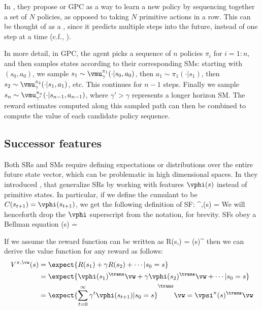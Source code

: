 In \citep{Thakoor2022}, they propose
 or GPC
as a way to learn a new policy by sequencing together
a set of $N$ policies, as opposed to taking $N$ primitive actions
in a row.
This can be thought of as a , since it predicts
multiple steps into the future, instead of one step at a time
(c.f., \citep{Zhang2023jumpy}).

In more detail, in GPC, the agent picks a sequence of $n$
policies $\pi_i$ for $i=1:n$, and then samples states
according to their corresponding SMs:
starting with $(s_0,a_0)$, we sample
$s_1 \sim \vmu_{\gamma}^{\pi_1}(\cdot|s_0,a_0)$,
then $a_1 \sim \pi_1(\cdot | s_1)$,
then
$s_2 \sim \vmu_{\gamma}^{\pi_2}(\cdot|s_1,a_1)$,
etc.
This continues for $n-1$ steps.
Finally we sample $s_n \sim \vmu_{\gamma'}^{\pi_n}(\cdot|s_{n-1},a_{n-1})$,
where $\gamma' > \gamma$ represents a longer horizon SM.
The reward estimates computed along this sampled path can then
be combined to compute the value of each candidate policy sequence.


\subsection{Successor features}
\label{sec:SF}

Both SRs and SMs require defining expectations
or distributions over the entire future state vector,
which can be problematic in high dimensional spaces.
In \citep{Barreto2017} they introduced
, that generalize
SRs by working with features $\vphi(s)$ instead
of primitive states. In particular, if we define
the cumulant to be
$C(s_{t+1}) = \vphi(s_{t+1})$,
we get the following definition of SF:
\be
\vpsi^{\pi,\vphi}(s) = 
\ee
We will henceforth drop the $\vphi$ superscript from the notation,
for brevity.
SFs obey a Bellman equation
\be
\vpsi(s) = 
\ee

If we assume the reward function can be written as
\be
R(s,\vw) = \vphi(s)^\trans \vw
\ee
then we can derive the value function for any reward
as follows:
\begin{align}
  V^{\pi,\vw}(s)
  &= \expect{R(s_1) + \gamma R(s_2) + \cdots \vert  s_0=s} \\
  &= \expect{\vphi(s_1)^\trans \vw + \gamma \vphi(s_2)^\trans \vw + \cdots \vert  s_0=s} \\
  &= \expect{\sum_{t=0}^{\infty} \gamma^t \vphi(s_{t+1}) \vert  s_0=s}^\trans \vw 
  = \vpsi^{\pi}(s)^\trans \vw
\end{align}


